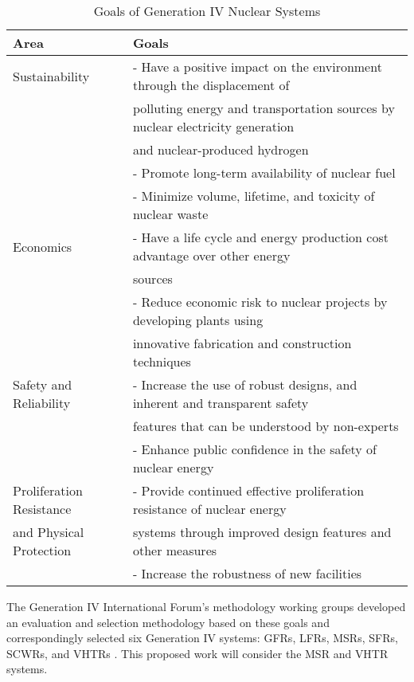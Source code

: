 \begin{table}[]
    \centering
    \onehalfspacing
    \caption{Goals of Generation IV Nuclear Systems \cite{gif_technology_2002,
    behar_technology_2014}}
	\label{tab:goals-gen4}
    \footnotesize
    \begin{tabular}{l|l}
    \hline
                               \textbf{Area} & \textbf{Goals} \\ \hline
    Sustainability   & - Have a positive impact on the environment through the displacement of \\
    & polluting energy and transportation sources by nuclear electricity generation \\
    & and nuclear-produced hydrogen \\ 
    & - Promote long-term availability of nuclear fuel \\
    & - Minimize volume, lifetime, and toxicity of nuclear waste \\ \hline
    Economics & - Have a life cycle and energy production cost advantage over other energy \\
    & sources \\ 
    & - Reduce economic risk to nuclear projects by developing plants using \\
    & innovative fabrication and construction techniques \\ \hline
    Safety and Reliability   & - Increase the use of robust designs, and inherent and transparent safety\\
    & features that can be understood by non-experts \\ 
    & - Enhance public confidence in the safety of nuclear energy \\\hline
    Proliferation Resistance & - Provide continued effective proliferation resistance of nuclear energy \\
    and Physical Protection & systems through improved design features and other measures \\ 
    & - Increase the robustness of new facilities \\ \hline
    \end{tabular}
    \end{table}

The Generation IV International Forum's methodology working groups developed 
an evaluation and selection methodology based on these goals 
and correspondingly selected six Generation IV systems: \glspl{GFR}, 
\glspl{LFR}, \glspl{MSR}, \glspl{SFR}, \glspl{SCWR}, and \glspl{VHTR} 
\cite{gif_technology_2002}. 
This proposed work will consider the \gls{MSR} and \gls{VHTR} systems. 

